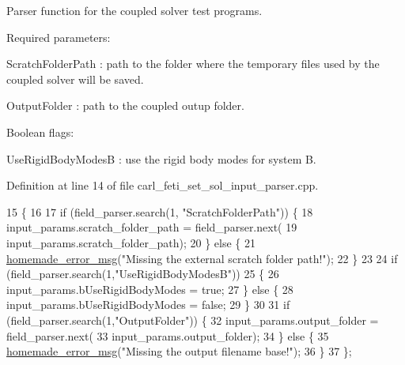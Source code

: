 Parser function for the coupled solver test programs. 

Required parameters\+:
\begin{DoxyItemize}
\item {\ttfamily Scratch\+Folder\+Path} \+: path to the folder where the temporary files used by the coupled solver will be saved.
\item {\ttfamily Output\+Folder} \+: path to the coupled outup folder.
\end{DoxyItemize}

Boolean flags\+:
\begin{DoxyItemize}
\item {\ttfamily Use\+Rigid\+Body\+Modes\+B} \+: use the rigid body modes for system B. 
\end{DoxyItemize}

Definition at line 14 of file carl\+\_\+feti\+\_\+set\+\_\+sol\+\_\+input\+\_\+parser.\+cpp.


\begin{DoxyCode}
15                                            \{
16 
17     \textcolor{keywordflow}{if} (field\_parser.search(1, \textcolor{stringliteral}{"ScratchFolderPath"})) \{
18         input\_params.scratch\_folder\_path = field\_parser.next(
19                 input\_params.scratch\_folder\_path);
20     \} \textcolor{keywordflow}{else} \{
21         \hyperlink{common__header_8h_a05d65d26b911668ac90085745dca71f6}{homemade\_error\_msg}(\textcolor{stringliteral}{"Missing the external scratch folder path!"});
22     \}
23 
24     \textcolor{keywordflow}{if} (field\_parser.search(1,\textcolor{stringliteral}{"UseRigidBodyModesB"}))
25     \{
26         input\_params.bUseRigidBodyModes = \textcolor{keyword}{true};
27     \} \textcolor{keywordflow}{else} \{
28         input\_params.bUseRigidBodyModes = \textcolor{keyword}{false};
29     \}
30 
31     \textcolor{keywordflow}{if} (field\_parser.search(1,\textcolor{stringliteral}{"OutputFolder"})) \{
32         input\_params.output\_folder = field\_parser.next(
33                 input\_params.output\_folder);
34     \} \textcolor{keywordflow}{else} \{
35         \hyperlink{common__header_8h_a05d65d26b911668ac90085745dca71f6}{homemade\_error\_msg}(\textcolor{stringliteral}{"Missing the output filename base!"});
36     \}
37 \};
\end{DoxyCode}
\hypertarget{namespacecarl_a3e93400b1873e44916865a36944134fa}{}
